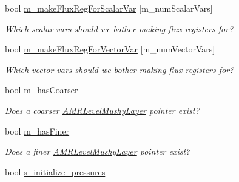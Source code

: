 \begin{DoxyCompactItemize}
\item 
\hypertarget{class_a_m_r_level_mushy_layer_a934fadf749cd979e03db2a084450ae73}{bool \hyperlink{class_a_m_r_level_mushy_layer_a934fadf749cd979e03db2a084450ae73}{m\-\_\-make\-Flux\-Reg\-For\-Scalar\-Var} \mbox{[}m\-\_\-num\-Scalar\-Vars\mbox{]}}\label{class_a_m_r_level_mushy_layer_a934fadf749cd979e03db2a084450ae73}

\begin{DoxyCompactList}\small\item\em Which scalar vars should we bother making flux registers for? \end{DoxyCompactList}\item 
\hypertarget{class_a_m_r_level_mushy_layer_adc0b73ca3269c4015bcc31850ab50785}{bool \hyperlink{class_a_m_r_level_mushy_layer_adc0b73ca3269c4015bcc31850ab50785}{m\-\_\-make\-Flux\-Reg\-For\-Vector\-Var} \mbox{[}m\-\_\-num\-Vector\-Vars\mbox{]}}\label{class_a_m_r_level_mushy_layer_adc0b73ca3269c4015bcc31850ab50785}

\begin{DoxyCompactList}\small\item\em Which vector vars should we bother making flux registers for? \end{DoxyCompactList}\item 
\hypertarget{class_a_m_r_level_mushy_layer_a3b035a45d271c4c771406dc0f181d44e}{bool \hyperlink{class_a_m_r_level_mushy_layer_a3b035a45d271c4c771406dc0f181d44e}{m\-\_\-has\-Coarser}}\label{class_a_m_r_level_mushy_layer_a3b035a45d271c4c771406dc0f181d44e}

\begin{DoxyCompactList}\small\item\em Does a coarser \hyperlink{class_a_m_r_level_mushy_layer}{A\-M\-R\-Level\-Mushy\-Layer} pointer exist? \end{DoxyCompactList}\item 
\hypertarget{class_a_m_r_level_mushy_layer_a4ae86c69a9100a32c7cc278100a534ee}{bool \hyperlink{class_a_m_r_level_mushy_layer_a4ae86c69a9100a32c7cc278100a534ee}{m\-\_\-has\-Finer}}\label{class_a_m_r_level_mushy_layer_a4ae86c69a9100a32c7cc278100a534ee}

\begin{DoxyCompactList}\small\item\em Does a finer \hyperlink{class_a_m_r_level_mushy_layer}{A\-M\-R\-Level\-Mushy\-Layer} pointer exist? \end{DoxyCompactList}\item 
\hypertarget{class_a_m_r_level_mushy_layer_a569c5dbec07fb04ccdd094584b66f7af}{bool \hyperlink{class_a_m_r_level_mushy_layer_a569c5dbec07fb04ccdd094584b66f7af}{s\-\_\-initialize\-\_\-pressures}}\label{class_a_m_r_level_mushy_layer_a569c5dbec07fb04ccdd094584b66f7af}


\end{DoxyCompactItemize}
